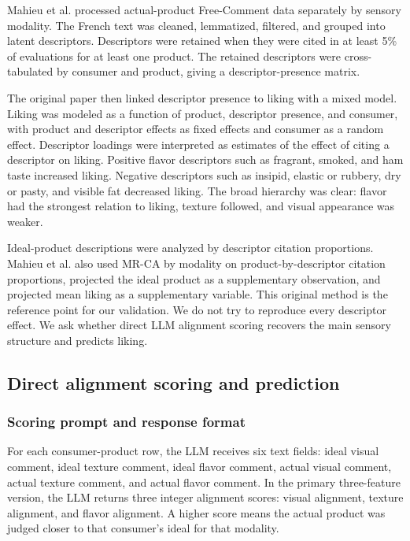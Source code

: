 \documentclass[12pt]{article}
\begin{document}
Mahieu et al. processed actual-product Free-Comment data separately by sensory modality. The French text was cleaned, lemmatized, filtered, and grouped into latent descriptors. Descriptors were retained when they were cited in at least 5\% of evaluations for at least one product. The retained descriptors were cross-tabulated by consumer and product, giving a descriptor-presence matrix.

The original paper then linked descriptor presence to liking with a mixed model. Liking was modeled as a function of product, descriptor presence, and consumer, with product and descriptor effects as fixed effects and consumer as a random effect. Descriptor loadings were interpreted as estimates of the effect of citing a descriptor on liking. Positive flavor descriptors such as fragrant, smoked, and ham taste increased liking. Negative descriptors such as insipid, elastic or rubbery, dry or pasty, and visible fat decreased liking. The broad hierarchy was clear: flavor had the strongest relation to liking, texture followed, and visual appearance was weaker.

Ideal-product descriptions were analyzed by descriptor citation proportions. Mahieu et al. also used MR-CA by modality on product-by-descriptor citation proportions, projected the ideal product as a supplementary observation, and projected mean liking as a supplementary variable. This original method is the reference point for our validation. We do not try to reproduce every descriptor effect. We ask whether direct LLM alignment scoring recovers the main sensory structure and predicts liking.

\subsection{Direct alignment scoring and prediction}

\subsubsection{Scoring prompt and response format}

For each consumer-product row, the LLM receives six text fields: ideal visual comment, ideal texture comment, ideal flavor comment, actual visual comment, actual texture comment, and actual flavor comment. In the primary three-feature version, the LLM returns three integer alignment scores: visual alignment, texture alignment, and flavor alignment. A higher score means the actual product was judged closer to that consumer's ideal for that modality.
\end{document}
